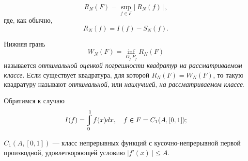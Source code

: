 \documentclass[a5paper,12pt]{book}
\begin{document}
	\vspace{-1mm}
	\footnotesize $$R_N(F) = \sup_{f \in F}|\ R_N(f)\ |,$$\normalsize
	\vskip -3mm
	\noindent где, как обычно,
	\vspace{1mm} \small$$R_N(f) = I(f) - S_N(f).$$

	\vspace{-2mm} Нижняя грань
	\vspace{2mm}
	\footnotesize $$W_N(F)=\inf_{D_j\ P_j} R_N(F)$$\normalsize
	\noindent называется \textit{оптимальной оценкой погрешности квадратур на рассматриваемом классе}.
	Если существует квадратура, для которой $R_N(F)=W_N(F)$, то такую квадратуру
	называют \textit{оптимальной}, или \textit{наилучшей}, \textit{на рассматриваемом классе}.

	Обратимся к случаю
	\vspace{-2mm}
	\footnotesize $$I(f)=\varint\limits_{0}^{1}f(x)dx, \ \ \ f \in F=C_1(A,[0,1]);$$ \normalsize
	\vskip -2mm

	\noindent $C_1(A,[0,1])$ --- класс непрерывных функций с кусочно-непрерыв\-ной
	первой производной, удовлетворяющей условию $|f'(x)\ | \leqslant A$.
\end{document}
